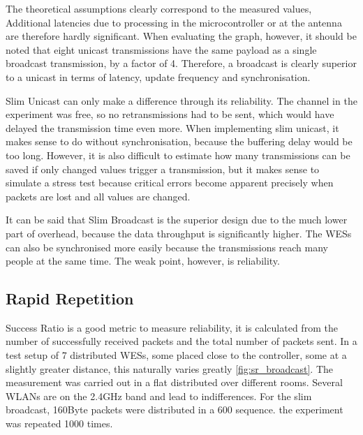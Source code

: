 The theoretical assumptions clearly correspond to the measured values,
Additional latencies due to processing in the microcontroller or at the antenna are therefore hardly significant.
When evaluating the graph, however, 
it should be noted that eight unicast transmissions have the same payload as a single broadcast transmission, by a factor of 4.
Therefore, a broadcast is clearly superior to a unicast in terms of latency, update frequency and synchronisation.

Slim Unicast can only make a difference through its reliability.
The channel in the experiment was free, so no retransmissions had to be sent, which would have delayed the transmission time even more.
When implementing slim unicast, it makes sense to do without synchronisation, because the buffering delay would be too long.
However, it is also difficult to estimate how many transmissions can be saved if only changed values trigger a transmission,
but it makes sense to simulate a stress test because critical errors become apparent precisely
when packets are lost and all values are changed.

It can be said that Slim Broadcast is the superior design due to the much lower part of overhead, 
because the data throughput is significantly higher.
The WESs can also be synchronised more easily because the transmissions reach many people at the same time.
The weak point, however, is reliability.

\subsection*{Rapid Repetition}

Success Ratio is a good metric to measure reliability, 
it is calculated from the number of successfully received packets and the total number of packets sent.
In a test setup of 7 distributed WESs, some placed close to the controller, some at a slightly greater distance,
this naturally varies greatly \cref{fig:sr_broadcast}.
The measurement was carried out in a flat distributed over different rooms.
Several WLANs are on the 2.4GHz band and lead to indifferences.
For the slim broadcast, 160Byte packets were distributed in a 600 sequence. the experiment was repeated 1000 times.

